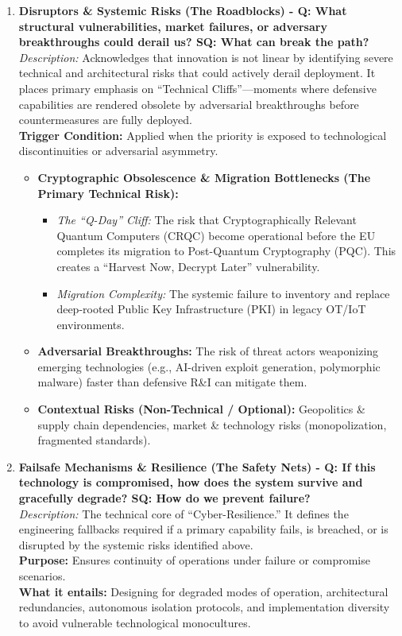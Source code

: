 \documentclass{ieeeaccess}
\begin{document}
\begin{enumerate}
    \item \textbf{Disruptors \& Systemic Risks (The Roadblocks) - Q: What structural vulnerabilities, market failures, or adversary breakthroughs could derail us? SQ: What can break the path?}\\
    \textit{Description:} Acknowledges that innovation is not linear by identifying severe technical and architectural risks that could actively derail deployment. It places primary emphasis on ``Technical Cliffs''---moments where defensive capabilities are rendered obsolete by adversarial breakthroughs before countermeasures are fully deployed.\\
    \textbf{Trigger Condition:} Applied when the priority is exposed to technological discontinuities or adversarial asymmetry.
    \begin{itemize}
        \item \textbf{Cryptographic Obsolescence \& Migration Bottlenecks (The Primary Technical Risk):}
        \begin{itemize}
            \item \textit{The ``Q-Day'' Cliff:} The risk that Cryptographically Relevant Quantum Computers (CRQC) become operational before the EU completes its migration to Post-Quantum Cryptography (PQC). This creates a ``Harvest Now, Decrypt Later'' vulnerability.
            \item \textit{Migration Complexity:} The systemic failure to inventory and replace deep-rooted Public Key Infrastructure (PKI) in legacy OT/IoT environments.
        \end{itemize}
        \item \textbf{Adversarial Breakthroughs:} The risk of threat actors weaponizing emerging technologies (e.g., AI-driven exploit generation, polymorphic malware) faster than defensive R\&I can mitigate them.
        \item \textbf{Contextual Risks (Non-Technical / Optional):} Geopolitics \& supply chain dependencies, market \& technology risks (monopolization, fragmented standards).
    \end{itemize}

    \item \textbf{Failsafe Mechanisms \& Resilience (The Safety Nets) - Q: If this technology is compromised, how does the system survive and gracefully degrade? SQ: How do we prevent failure?}\\
    \textit{Description:} The technical core of ``Cyber-Resilience.'' It defines the engineering fallbacks required if a primary capability fails, is breached, or is disrupted by the systemic risks identified above.\\
    \textbf{Purpose:} Ensures continuity of operations under failure or compromise scenarios.\\
    \textbf{What it entails:} Designing for degraded modes of operation, architectural redundancies, autonomous isolation protocols, and implementation diversity to avoid vulnerable technological monocultures.


\end{enumerate}
\end{document}
